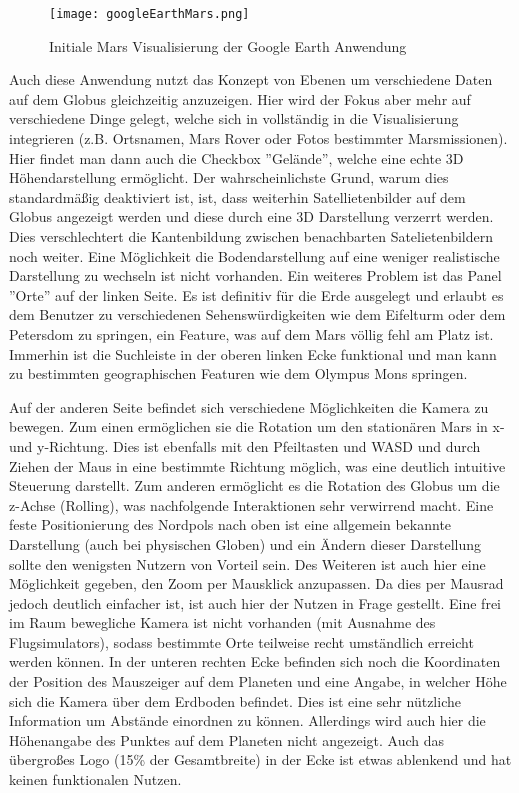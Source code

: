 \begin{figure}[H]
  \texttt{[image: googleEarthMars.png]}
  \caption{Initiale Mars Visualisierung der Google Earth Anwendung}
  \label{googleEarthMars}
\end{figure}

Auch diese Anwendung nutzt das Konzept von Ebenen um verschiedene Daten auf dem Globus gleichzeitig anzuzeigen. Hier wird der Fokus aber mehr auf verschiedene Dinge gelegt, welche sich in vollständig in die Visualisierung integrieren (z.B. Ortsnamen, Mars Rover oder Fotos bestimmter Marsmissionen). Hier findet man dann auch die Checkbox ''Gelände'', welche eine echte 3D Höhendarstellung ermöglicht. Der wahrscheinlichste Grund, warum dies standardmäßig deaktiviert ist, ist, dass weiterhin Satellietenbilder auf dem Globus angezeigt werden und diese durch eine 3D Darstellung verzerrt werden. Dies verschlechtert die Kantenbildung zwischen benachbarten Satelietenbildern noch weiter. Eine Möglichkeit die Bodendarstellung auf eine weniger realistische Darstellung zu wechseln ist nicht vorhanden. Ein weiteres Problem ist das Panel ''Orte'' auf der linken Seite. Es ist definitiv für die Erde ausgelegt und erlaubt es dem Benutzer zu verschiedenen Sehenswürdigkeiten wie dem Eifelturm oder dem Petersdom zu springen, ein Feature, was auf dem Mars völlig fehl am Platz ist. Immerhin ist die Suchleiste in der oberen linken Ecke funktional und man kann zu bestimmten geographischen Featuren wie dem Olympus Mons springen.

Auf der anderen Seite befindet sich verschiedene Möglichkeiten die Kamera zu bewegen. Zum einen ermöglichen sie die Rotation um den stationären Mars in x- und y-Richtung. Dies ist ebenfalls mit den Pfeiltasten und WASD und durch Ziehen der Maus in eine bestimmte Richtung möglich, was eine deutlich intuitive Steuerung darstellt. Zum anderen ermöglicht es die Rotation des Globus um die z-Achse (Rolling), was nachfolgende Interaktionen sehr verwirrend macht. Eine feste Positionierung des Nordpols nach oben ist eine allgemein bekannte Darstellung (auch bei physischen Globen) und ein Ändern dieser Darstellung sollte den wenigsten Nutzern von Vorteil sein. Des Weiteren ist auch hier eine Möglichkeit gegeben, den Zoom per Mausklick anzupassen. Da dies per Mausrad jedoch deutlich einfacher ist, ist auch hier der Nutzen in Frage gestellt. Eine frei im Raum bewegliche Kamera ist nicht vorhanden (mit Ausnahme des Flugsimulators), sodass bestimmte Orte teilweise recht umständlich erreicht werden können. In der unteren rechten Ecke befinden sich noch die Koordinaten der Position des Mauszeiger auf dem Planeten und eine Angabe, in welcher Höhe sich die Kamera über dem Erdboden befindet. Dies ist eine sehr nützliche Information um Abstände einordnen zu können. Allerdings wird auch hier die Höhenangabe des Punktes auf dem Planeten nicht angezeigt. Auch das übergroßes Logo (15\% der Gesamtbreite) in der Ecke ist etwas ablenkend und hat keinen funktionalen Nutzen.

